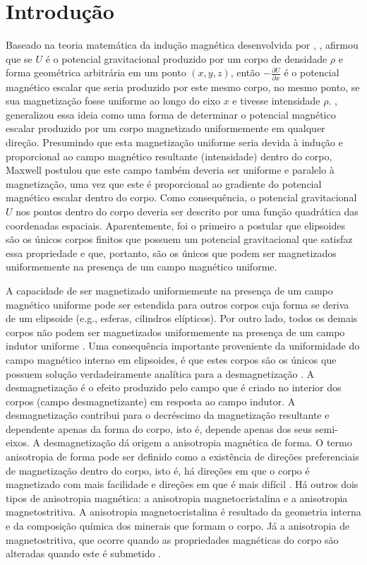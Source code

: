 \chapter{Introdução}


Baseado na teoria matemática da indução magnética desenvolvida por
\citet{poisson1824}, \citet{maxwell1873}, afirmou que se $U$ 
é o potencial gravitacional produzido por um corpo de 
densidade $\rho$ e forma geométrica arbitrária em um ponto $(x, y, z)$,
então $-\frac{\partial U}{\partial x}$ é o potencial magnético escalar que seria
produzido por este mesmo corpo, no mesmo ponto, se sua magnetização fosse 
uniforme ao longo do eixo $x$ e tivesse intensidade $\rho$.
\citet{maxwell1873}, generalizou essa ideia como uma forma de
determinar o potencial magnético escalar produzido por um corpo 
magnetizado uniformemente em qualquer direção. Presumindo que 
esta magnetização uniforme seria devida à indução e proporcional ao campo magnético resultante (intensidade) dentro do corpo, Maxwell postulou que este campo também deveria ser uniforme e paralelo à magnetização, uma vez que este é proporcional ao gradiente do potencial magnético escalar dentro do corpo.
Como consequência, o potencial gravitacional $U$ nos pontos dentro do
corpo deveria ser descrito por uma função quadrática das coordenadas espaciais.
Aparentemente, \citet{maxwell1873} foi o primeiro a postular que elipsoides
são os únicos corpos finitos que possuem um potencial gravitacional que
satisfaz essa propriedade e que, portanto, são os únicos que podem ser
magnetizados uniformemente na presença de um campo magnético uniforme.

A capacidade de ser magnetizado uniformemente na presença de um campo magnético uniforme 
pode ser estendida para outros corpos cuja forma se
deriva de um elipsoide (e.g., esferas, cilindros elípticos). Por outro lado, todos
os demais corpos não podem ser magnetizados uniformemente na presença de um
campo indutor uniforme \citep{jahren1963, schlomann1965, clark1999}.
Uma consequência importante proveniente da uniformidade do campo magnético interno em elipsoides, 
é que estes corpos são os únicos que possuem solução 
verdadeiramente analítica para a desmagnetização \citet{clark1986}.
A desmagnetização é o efeito produzido pelo campo que é criado no interior dos corpos (campo desmagnetizante) em resposta ao campo indutor. A desmagnetização contribui para o decréscimo da magnetização resultante e dependente apenas da forma do corpo, isto é, depende apenas dos seus semi-eixos. A desmagnetização dá origem a anisotropia magnética de forma. O termo anisotropia de forma pode ser definido como a existência de direções preferenciais de magnetização dentro do corpo, isto é, há direções em que o corpo é magnetizado com mais facilidade e direções em que é mais difícil \citep{thompson1986, dunlop1997, clark1999}.
Há outros dois tipos de anisotropia magnética: a anisotropia magnetocristalina e a anisotropia magnetostritiva. A anisotropia magnetocristalina é resultado da geometria interna e da composição química dos minerais que formam o corpo. Já a anisotropia de magnetostritiva, que ocorre quando as propriedades magnéticas do corpo são alteradas quando este é submetido \citep{tauxe2003rudiments, thompson1986}.

